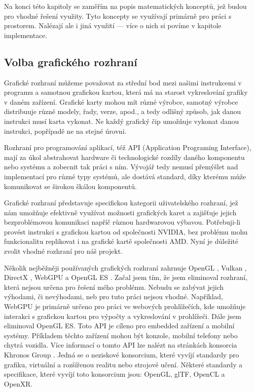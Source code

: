 \documentclass[12pt]{article}
\begin{document}
Na konci této kapitoly se zaměřím na popis matematických konceptů, jež budou pro vhodné řešení využity. Tyto koncepty se využívají primárně pro práci s prostorem. Nalézají ale i jiná využití — více o nich si povíme v kapitole implementace.

\subsection{Volba grafického rozhraní}

Grafické rozhraní můžeme považovat za střední bod mezi našimi instrukcemi v programu a samotnou grafickou kartou, která má na starost vykreslování grafiky v daném zařízení. Grafické karty mohou mít různé výrobce, samotný výrobce distribuuje různé modely, řady, verze, apod., a tedy odlišný způsob, jak danou instrukci musí karta vykonat. Ne každý grafický čip umožňuje vykonat danou instrukci, popřípadě ne na stejné úrovni.

Rozhraní pro programování aplikací, též API (Application Programing Interface), mají za úkol abstrahovat hardware či technologické rozdíly daného komponentu nebo systému a zobecnit tak práci s ním. Vývojář tedy nemusí přemýšlet nad implementací pro různé typy systémů, ale dostává standard, díky kterému může komunikovat se širokou škálou komponentů.

Grafické rozhraní představuje specifickou kategorii uživatelského rozhraní, jež nám umožňuje efektivně využívat možnosti grafických karet a zajišťuje jejich bezproblémovou komunikaci napříč různou hardwarovou výbavou. Potřebuji-li provést instrukci s grafickou kartou od společnosti NVIDIA, bez problému mohu funkcionalitu replikovat i na grafické kartě společnosti AMD. Nyní je důležité zvolit vhodné rozhraní pro náš projekt.

Několik nejběžněji používaných grafických rozhraní zahrnuje OpenGL \cite{opengl}, Vulkan \cite{vulkan}, DirectX \cite{directx}, WebGPU \cite{webgpu} a OpenGL ES \cite{opengles}. Začal jsem tím, že jsem eliminoval rozhraní, která nejsou určena pro řešení mého problému. Nebudu se zabývat jejich výhodami, či nevýhodami, neb pro tuto práci nejsou vhodné. Například, WebGPU je primárně určeno pro práci ve webových prohlížečích, kde umožňuje interakci s grafickou kartou pro výpočty a vykreslování v prohlížeči. Dále jsem eliminoval OpenGL ES. Toto API je cíleno pro embedded zařízení a mobilní systémy. Příkladem těchto zařízení mohou být konzole, mobilní telefony nebo chytrá vozidla. Více informací o tomto API lze nalézt na stránkách konsorcia Khronos Group \cite{khronos}. Jedná se o neziskové konsorcium, které vyvíjí standardy pro grafiku, virtuální a rozšířenou realitu nebo strojové učení. Některé standardy a specifikace, které vyvíjí toto konsorcium jsou: OpenGL, glTF, OpenCL a OpenXR.
\end{document}
